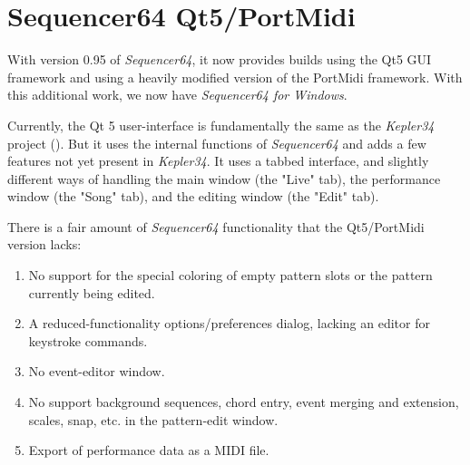 %
%
%

\section{Sequencer64 Qt5/PortMidi}
\label{sec:qt_portmidi}

   With version 0.95 of \textsl{Sequencer64}, it now provides builds using the
   Qt5 GUI framework and using a heavily modified version of the PortMidi
   framework.
   With this additional work, we now have
   \textsl{Sequencer64 for Windows}.

   Currently, the Qt 5 user-interface is fundamentally the same as
   the \textsl{Kepler34} project (\cite{kepler34}).
   But it uses the internal functions of \textsl{Sequencer64} and adds a few
   features not yet present in \textsl{Kepler34}.
   It uses a tabbed interface, and slightly different ways of handling the main
   window (the "Live" tab), the performance window (the "Song" tab), and the
   editing window (the "Edit" tab).

   There is a fair amount of \textsl{Sequencer64} functionality that the
   Qt5/PortMidi version lacks:

   \begin{enumerate}
      \item No support for the special coloring of empty pattern slots
         or the pattern currently being edited.
      \item A reduced-functionality options/preferences dialog, lacking an
         editor for keystroke commands.
      \item No event-editor window.
      \item No support background sequences, chord entry, event merging and
         extension, scales, snap, etc. in the pattern-edit window.
      \item Export of performance data as a MIDI file.
   \end{enumerate}

